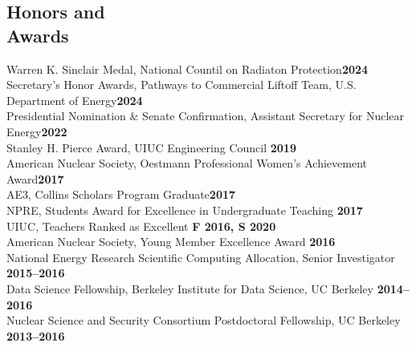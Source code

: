 \documentclass[margin,line]{resume}
\begin{document}
\begin{resume}
    \section{\mysidestyle Honors and\\Awards}
                Warren K. Sinclair Medal, National Countil on Radiaton Protection\hfill \textbf{2024}\vspace{.5mm}\\%
                Secretary's Honor Awards, Pathways to Commercial Liftoff Team, U.S. Department of Energy\hfill \textbf{2024}\vspace{0.5mm}\\%
                Presidential Nomination \& Senate Confirmation, Assistant Secretary for Nuclear Energy\hfill \textbf{2022}\vspace{.5mm}\\%
                Stanley H. Pierce Award, UIUC Engineering Council \hfill \textbf{2019}\vspace{.5mm}\\%
                American Nuclear Society, Oestmann Professional Women's Achievement Award\hfill \textbf{2017}\vspace{.5mm}\\%
                AE3, Collins Scholars Program Graduate\hfill \textbf{2017}\vspace{.5mm}\\%
                NPRE, Students Award for Excellence in Undergraduate Teaching \hfill \textbf{2017}\vspace{.5mm}\\%
                UIUC, Teachers Ranked as Excellent \hfill \textbf{F 2016, S 2020}\vspace{.5mm}\\%
                American Nuclear Society, Young Member Excellence Award                         \hfill \textbf{2016}\vspace{.5mm}\\%
                National Energy Research Scientific Computing Allocation, Senior Investigator     \hfill \textbf{2015--2016}\vspace{.5mm}\\%
                Data Science Fellowship, Berkeley Institute for Data Science, UC Berkeley     \hfill \textbf{2014--2016}\vspace{.5mm}\\%
                Nuclear Science and Security Consortium Postdoctoral Fellowship, UC Berkeley  \hfill \textbf{2013--2016}\vspace{.5mm}\\%

\end{resume}
\end{document}
